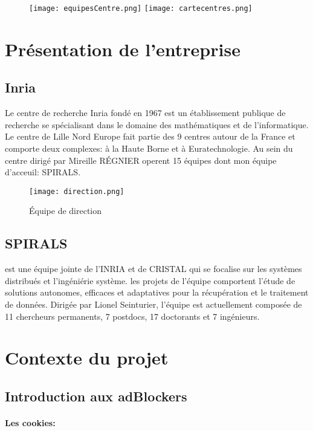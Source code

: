 \documentclass[oneside,a4paper,12pt]{article}
\begin{document}
\begin{figure}[h]
	\centering
	\texttt{[image: equipesCentre.png]}
	\texttt{[image: cartecentres.png]}
\end{figure}

\section{Présentation de l'entreprise} \label{PresentationInria}

\subsection{Inria}
Le centre de recherche Inria fondé en 1967 est un établissement publique de recherche se spécialisant dans le domaine des mathématiques et de l'informatique.\\ 
Le centre de Lille Nord Europe fait partie des 9 centres autour de la France et comporte deux complexes: à la Haute Borne et à Euratechnologie. 
Au sein du centre dirigé par Mireille R\'EGNIER operent 15 équipes dont mon équipe d'acceuil: SPIRALS. 

\begin{figure}[h]
	\centering
	\texttt{[image: direction.png]}
	\caption{\'Equipe de direction}
\end{figure}

\subsection{SPIRALS} est une équipe jointe de l'INRIA et de CRISTAL qui se focalise sur les systèmes distribués et l'ingéniérie système. les projets de l'équipe comportent l'étude de solutions autonomes, efficaces et adaptatives pour la récupération et le traitement de données. Dirigée par Lionel Seinturier, l'équipe est actuellement composée de 11 chercheurs permanents, 7 postdocs, 17 doctorants et 7 ingénieurs.

\newpage

\section{Contexte du projet}
\subsection{Introduction aux adBlockers}\label{Intro:adblock}

\paragraph*{Les cookies:}
\end{document}
